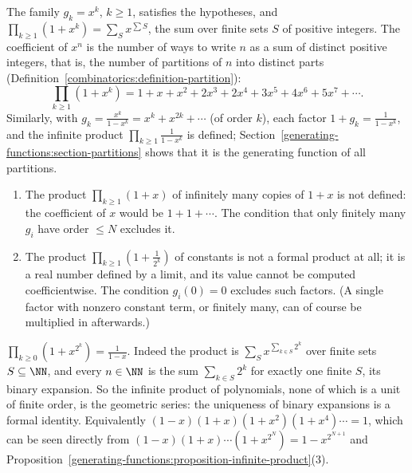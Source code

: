 \begin{example}\label{generating-functions:example-product-distinct}
The family $g_k = x^k$, $k \geq 1$, satisfies the hypotheses, and $\prod_{k \geq 1}(1 + x^k) = \sum_Sx^{\sum S}$, the sum over finite sets $S$ of positive integers. The coefficient of $x^n$ is the
number of ways to write $n$ as a sum of distinct positive integers, that is, the number of partitions of $n$ into distinct parts (Definition~\ref{combinatorics:definition-partition}):
\[
\prod_{k \geq 1}(1 + x^k) = 1 + x + x^2 + 2x^3 + 2x^4 + 3x^5 + 4x^6 + 5x^7 + \cdots.
\]
Similarly, with $g_k = \frac{x^k}{1 - x^k} = x^k + x^{2k} + \cdots$ (of order $k$), each factor $1 + g_k = \frac{1}{1 - x^k}$, and the infinite product $\prod_{k \geq 1}\frac{1}{1 - x^k}$ is defined;
Section~\ref{generating-functions:section-partitions} shows that it is the generating function of all partitions.
\end{example}

\begin{counterexample}\label{generating-functions:counterexample-products}
\begin{enumerate}
\item The product $\prod_{k \geq 1}(1 + x)$ of infinitely many copies of $1 + x$ is not defined: the coefficient of $x$ would be $1 + 1 + \cdots$. The condition that only finitely many $g_i$ have
order $\leq N$ excludes it.
\item The product $\prod_{k \geq 1}(1 + \frac{1}{2^k})$ of constants is not a formal product at all; it is a real number defined by a limit, and its value cannot be computed coefficientwise. The
condition $g_i(0) = 0$ excludes such factors. (A single factor with nonzero constant term, or finitely many, can of course be multiplied in afterwards.)
\end{enumerate}
\end{counterexample}

\begin{example}\label{generating-functions:example-binary-product}
$\prod_{k \geq 0}(1 + x^{2^k}) = \frac{1}{1 - x}$. Indeed the product is $\sum_Sx^{\sum_{k \in S}2^k}$ over finite sets $S \subseteq \NN$, and every $n \in \NN$ is the sum $\sum_{k \in S}2^k$ for
exactly one finite $S$, its binary expansion. So the infinite product of polynomials, none of which is a unit of finite order, is the geometric series: the uniqueness of binary expansions is a formal
identity. Equivalently $(1 - x)(1 + x)(1 + x^2)(1 + x^4) \cdots = 1$, which can be seen directly from $(1 - x)(1 + x) \cdots (1 + x^{2^{N}}) = 1 - x^{2^{N+1}}$ and
Proposition~\ref{generating-functions:proposition-infinite-product}(3).
\end{example}

